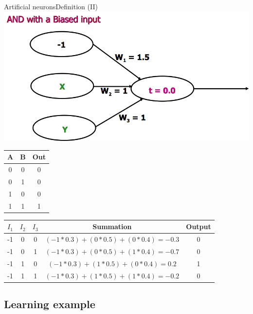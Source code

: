 \documentclass[10pt,compress]{beamer} %
\begin{document}
\begin{frame}{Artificial neurons}{Definition (II)}
	\centering\includegraphics[width=0.4\linewidth]{figs/learning4.png}
	\footnotesize{
		\centering \begin{tabular}{|cc|c|}\hline
		A & B & Out\\\hline
		0 & 0 & 0\\
		0 & 1 & 0\\
		1 & 0 & 0\\
		1 & 1 & 1\\\hline
		\end{tabular}
	}
	\footnotesize{
		\centering \begin{tabular}{|c|c|c|c|c|}\hline
		$I_1$ & $I_2$ & $I_3$ & Summation & Output\\\hline
		-1    & 0     & 0     & $(-1 * 0.3) + (0*0.5) + (0*0.4) = -0.3$ & 0\\
		-1    & 0     & 1     & $(-1 * 0.3) + (0*0.5) + (1*0.4) = -0.7$ & 0\\
		-1    & 1     & 0     & $(-1 * 0.3) + (1*0.5) + (0*0.4) = 0.2$ & 1\\
		-1    & 1     & 1     & $(-1 * 0.3) + (1*0.5) + (1*0.4) = -0.2$ & 0\\\hline
		\end{tabular}
	}
\end{frame}



\subsection{Learning example}
\end{document}
